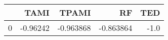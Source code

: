 \begin{tabular}{lrrrr}
\toprule
{} &     TAMI &     TPAMI &        RF &  TED \\
\midrule
0 & -0.96242 & -0.963868 & -0.863864 & -1.0 \\
\bottomrule
\end{tabular}
